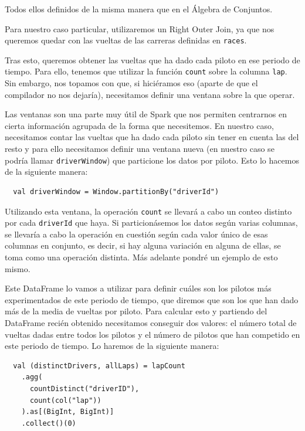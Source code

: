 \documentclass[12pt,twoside,titlepage]{report}
\begin{document}
Todos ellos definidos de la misma manera que en el Álgebra de Conjuntos.

Para nuestro caso particular, utilizaremos un Right Outer Join, ya que nos queremos quedar con las vueltas de las carreras definidas en \texttt{races}.

Tras esto, queremos obtener las vueltas que ha dado cada piloto en ese periodo de tiempo. Para ello, tenemos que utilizar la función \texttt{count} sobre la columna \texttt{lap}. Sin embargo, nos topamos con que, si hiciéramos eso (aparte de que el compilador no nos dejaría), necesitamos definir una ventana sobre la que operar.

Las ventanas son una parte muy útil de Spark que nos permiten centrarnos en cierta información agrupada de la forma que necesitemos. En nuestro caso, necesitamos contar las vueltas que ha dado cada piloto sin tener en cuenta las del resto y para ello necesitamos definir una ventana nueva (en nuestro caso se podría llamar \texttt{driverWindow}) que particione los datos por piloto. Esto lo hacemos de la siguiente manera:

\begin{lstlisting}
  val driverWindow = Window.partitionBy("driverId") 
\end{lstlisting}

Utilizando esta ventana, la operación \texttt{count} se llevará a cabo un conteo distinto por cada \texttt{driverId} que haya. Si particionásemos los datos según varias columnas, se llevaría a cabo la operación en cuestión según cada valor único de esas columnas en conjunto, es decir, si hay alguna variación en alguna de ellas, se toma como una operación distinta. Más adelante pondré un ejemplo de esto mismo.

Este DataFrame lo vamos a utilizar para definir cuáles son los pilotos más experimentados de este periodo de tiempo, que diremos que son los que han dado más de la media de vueltas por piloto. Para calcular esto y partiendo del DataFrame recién obtenido necesitamos conseguir dos valores: el número total de vueltas dadas entre todos los pilotos y el número de pilotos que han competido en este periodo de tiempo. Lo haremos de la siguiente manera:

\begin{lstlisting}
  val (distinctDrivers, allLaps) = lapCount
    .agg(
      countDistinct("driverID"),
      count(col("lap"))
    ).as[(BigInt, BigInt)]
    .collect()(0)
\end{lstlisting}
\end{document}
